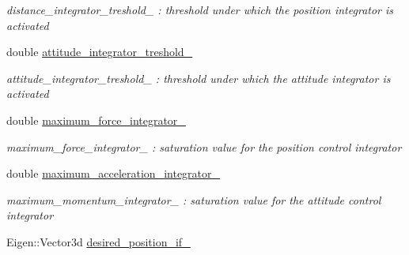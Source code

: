 \begin{DoxyCompactItemize}
\begin{DoxyCompactList}\small\item\em distance\-\_\-integrator\-\_\-treshold\-\_\- \-: threshold under which the position integrator is activated \end{DoxyCompactList}\item 
\hypertarget{class_skye_geometric_controller_a5f57a2407c42b2018af12fbb4cf34489}{double \hyperlink{class_skye_geometric_controller_a5f57a2407c42b2018af12fbb4cf34489}{attitude\-\_\-integrator\-\_\-treshold\-\_\-}}\label{class_skye_geometric_controller_a5f57a2407c42b2018af12fbb4cf34489}

\begin{DoxyCompactList}\small\item\em attitude\-\_\-integrator\-\_\-treshold\-\_\- \-: threshold under which the attitude integrator is activated \end{DoxyCompactList}\item 
\hypertarget{class_skye_geometric_controller_a086297b4c26d21f8cd6207650de04c8f}{double \hyperlink{class_skye_geometric_controller_a086297b4c26d21f8cd6207650de04c8f}{maximum\-\_\-force\-\_\-integrator\-\_\-}}\label{class_skye_geometric_controller_a086297b4c26d21f8cd6207650de04c8f}

\begin{DoxyCompactList}\small\item\em maximum\-\_\-force\-\_\-integrator\-\_\- \-: saturation value for the position control integrator \end{DoxyCompactList}\item 
\hypertarget{class_skye_geometric_controller_adc4fc8031b2928436d455f68ae4c66f2}{double \hyperlink{class_skye_geometric_controller_adc4fc8031b2928436d455f68ae4c66f2}{maximum\-\_\-acceleration\-\_\-integrator\-\_\-}}\label{class_skye_geometric_controller_adc4fc8031b2928436d455f68ae4c66f2}

\begin{DoxyCompactList}\small\item\em maximum\-\_\-momentum\-\_\-integrator\-\_\- \-: saturation value for the attitude control integrator \end{DoxyCompactList}\item 
\hypertarget{class_skye_geometric_controller_a3da2aa99720a266392a2e5910ce38fa0}{Eigen\-::\-Vector3d \hyperlink{class_skye_geometric_controller_a3da2aa99720a266392a2e5910ce38fa0}{desired\-\_\-position\-\_\-if\-\_\-}}\label{class_skye_geometric_controller_a3da2aa99720a266392a2e5910ce38fa0}


\end{DoxyCompactItemize}
